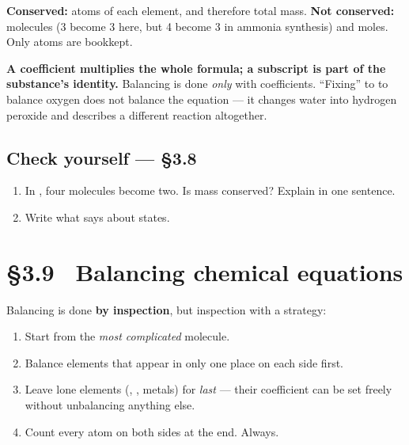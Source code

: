 \documentclass{apchem-worksheet}
\begin{document}
\textbf{Conserved:} atoms of each element, and therefore total mass.
\textbf{Not conserved:} molecules (3 become 3 here, but 4 become 3 in
ammonia synthesis) and moles. Only atoms are bookkept.

\begin{apctrap}
\textbf{A coefficient multiplies the whole formula; a subscript is part of
the substance's identity.} Balancing is done \emph{only} with
coefficients. ``Fixing''  to  to balance oxygen does not
balance the equation --- it changes water into hydrogen peroxide and
describes a different reaction altogether.
\end{apctrap}

\subsection*{\sffamily Check yourself --- \S3.8}

\begin{enumerate}[leftmargin=*,itemsep=0.4em]
  \item In , four molecules become two. Is mass
        conserved? Explain in one sentence.
  \item Write what  says about
        states. 
\end{enumerate}

\section*{\sffamily \S3.9 \textbullet\ Balancing chemical equations}

Balancing is done \textbf{by inspection}, but inspection with a strategy:

\begin{enumerate}[leftmargin=*,itemsep=0.2em]
  \item Start from the \emph{most complicated} molecule.
  \item Balance elements that appear in only one place on each side first.
  \item Leave lone elements (, , metals) for \emph{last} ---
        their coefficient can be set freely without unbalancing anything
        else.
  \item Count every atom on both sides at the end. Always.
\end{enumerate}
\end{document}
